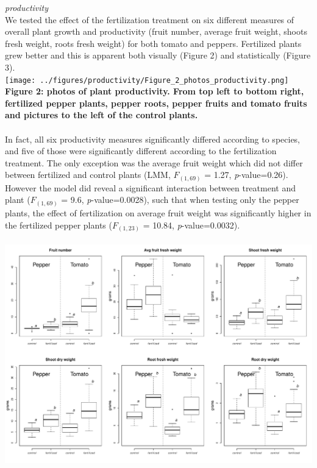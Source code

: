 \documentclass[11pt,]{article}
\begin{document}
\emph{productivity}\\
We tested the effect of the fertilization treatment on six different
measures of overall plant growth and productivity (fruit number, average
fruit weight, shoots fresh weight, roots fresh weight) for both tomato
and peppers. Fertilized plants grew better and this is apparent both
visually (Figure 2) and statistically (Figure 3). ~\\
\texttt{[image: ../figures/productivity/Figure\_2\_photos\_productivity.png]}\\
\textbf{Figure 2: photos of plant productivity. From top left to bottom
right, fertilized pepper plants, pepper roots, pepper fruits and tomato
fruits and pictures to the left of the control plants.}\\
\hspace*{0.333em}\\
In fact, all six productivity measures significantly differed according
to species, and five of those were significantly different according to
the fertilization treatment. The only exception was the average fruit
weight which did not differ between fertilized and control plants (LMM,
\(F_{(1,69)}\) = 1.27, \emph{p}-value=0.26). However the model did
reveal a significant interaction between treatment and plant
(\(F_{(1,69)}\) = 9.6, \emph{p}-value=0.0028), such that when testing
only the pepper plants, the effect of fertilization on average fruit
weight was significantly higher in the fertilized pepper plants
(\(F_{(1,23)}\) = 10.84, \emph{p}-value=0.0032).\\
\hspace*{0.333em}\\
\includegraphics[width=6.25000in]{../figures/productivity/Figure_3_productivity.pdf}\\
\end{document}

